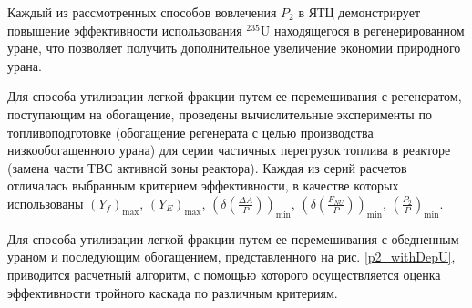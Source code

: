 Каждый из рассмотренных способов вовлечения $P_2$ в ЯТЦ демонстрирует повышение эффективности использования $^{235}$U находящего­ся в регенерированном уране, что позволяет получить дополнительное увеличение экономии природного урана.

Для способа утилизации легкой фракции путем ее перемешивания с регенератом, поступающим на обогащение, проведены вычислительные эксперименты по топливоподготовке (обогащение регенерата с целью производства низкообогащенного урана) для серии частичных перегрузок топлива в реакторе (замена части ТВС активной зоны реактора). Каждая из серий расчетов отличалась выбранным критерием эффективности, в качестве которых использованы $(Y_f)_\text{max}$, $(Y_{E})_\text{max}$, $(\delta(\frac{\Delta A}{P}))_\text{min}$, $(\delta(\frac{F_{NU}}{P}))_\text{min}$, $(\frac{P_2}{P})_\text{min}$. 

Для способа утилизации легкой фракции путем ее перемешивания с обедненным ураном и последующим обогащением, представленного на рис. \ref{p2_withDepU}, приводится расчетный алгоритм, с помощью которого осуществляется оценка эффективности тройного каскада по различным критериям.

